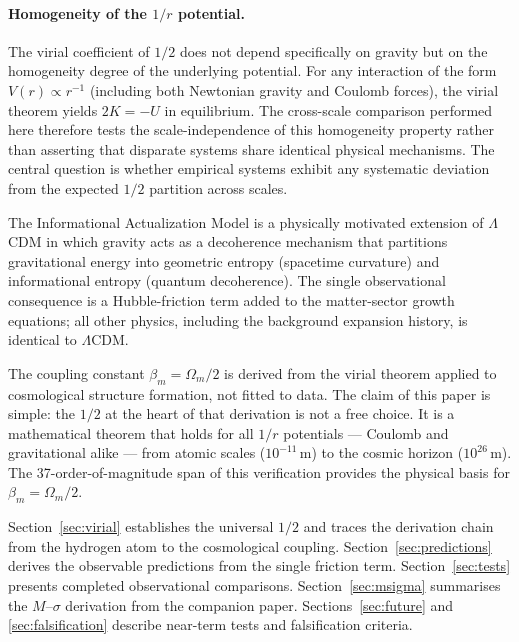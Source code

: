 \documentclass[12pt,a4paper]{article}
\begin{document}
\paragraph{Homogeneity of the $1/r$ potential.}
The virial coefficient of $1/2$ does not depend specifically on gravity but on the
homogeneity degree of the underlying potential. For any interaction of the form
$V(r) \propto r^{-1}$ (including both Newtonian gravity and Coulomb forces),
the virial theorem yields $2K = -U$ in equilibrium. The cross-scale comparison
performed here therefore tests the scale-independence of this homogeneity
property rather than asserting that disparate systems share identical physical
mechanisms. The central question is whether empirical systems exhibit any
systematic deviation from the expected $1/2$ partition across scales.


The Informational Actualization Model \citep{Mahaffey2026a} is a physically motivated
extension of $\Lambda$CDM in which gravity acts as a decoherence mechanism that
partitions gravitational energy into geometric entropy (spacetime curvature) and
informational entropy (quantum decoherence). The single observational consequence is a
Hubble-friction term added to the matter-sector growth equations; all other physics,
including the background expansion history, is identical to $\Lambda$CDM.

The coupling constant $\beta_m = \Omega_m/2$ is derived from the virial theorem applied
to cosmological structure formation, not fitted to data. The claim of this paper is
simple: the $1/2$ at the heart of that derivation is not a free choice. It is a
mathematical theorem that holds for all $1/r$ potentials --- Coulomb and gravitational
alike --- from atomic scales ($10^{-11}$\,m) to the cosmic horizon ($10^{26}$\,m). The
37-order-of-magnitude span of this verification provides the physical basis for
$\beta_m = \Omega_m/2$.

Section~\ref{sec:virial} establishes the universal $1/2$ and traces the derivation chain
from the hydrogen atom to the cosmological coupling. Section~\ref{sec:predictions}
derives the observable predictions from the single friction term. Section~\ref{sec:tests}
presents completed observational comparisons. Section~\ref{sec:msigma} summarises the
$M$--$\sigma$ derivation from the companion paper. Sections~\ref{sec:future} and
\ref{sec:falsification} describe near-term tests and falsification criteria.
\end{document}
